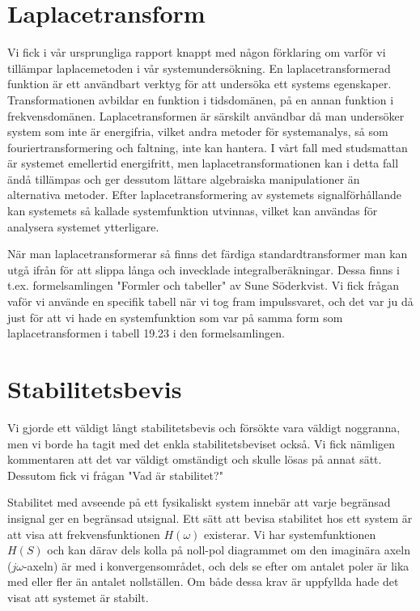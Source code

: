 \documentclass[10pt,a4paper]{article}
\begin{document}
\section{Laplacetransform}
Vi fick i vår ursprungliga rapport knappt med någon förklaring om varför vi tillämpar laplacemetoden i vår systemundersökning. En laplacetransformerad funktion är ett användbart verktyg för att undersöka ett systems egenskaper. Transformationen avbildar en funktion i tidsdomänen, på en annan funktion i frekvensdomänen. Laplacetransformen är särskilt användbar då man undersöker system som inte är energifria, vilket andra metoder för systemanalys, så som fouriertransformering och faltning, inte kan hantera. I vårt fall med studsmattan är systemet emellertid energifritt, men laplacetransformationen kan i detta fall ändå tillämpas och ger dessutom lättare algebraiska manipulationer än alternativa metoder.
Efter laplacetransformering av systemets signalförhållande kan systemets så kallade systemfunktion utvinnas, vilket kan användas för analysera systemet ytterligare.

När man laplacetransformerar så finns det färdiga standardtransformer man kan utgå ifrån för att slippa långa och invecklade integralberäkningar. Dessa finns i t.ex. formelsamlingen "Formler och tabeller" av Sune Söderkvist. Vi fick frågan vaför vi använde en specifik tabell när vi tog fram impulssvaret, och det var ju då just för att vi hade en systemfunktion som var på samma form som laplacetransformen i tabell 19.23 i den formelsamlingen.

\section{Stabilitetsbevis}

Vi gjorde ett väldigt långt stabilitetsbevis och försökte vara väldigt noggranna, men vi borde ha tagit med det enkla stabilitetsbeviset också. Vi fick nämligen kommentaren att det var väldigt omständigt och skulle lösas på annat sätt. Dessutom fick vi frågan "Vad är stabilitet?"

Stabilitet med avseende på ett fysikaliskt system innebär att varje begränsad insignal ger en begränsad utsignal. Ett sätt att bevisa stabilitet hos ett system är att visa att frekvensfunktionen $H(\omega)$ existerar. Vi har systemfunktionen $H(S)$ och kan därav dels kolla på noll-pol diagrammet om den imaginära axeln ($j\omega$-axeln) är med i konvergensområdet, och dels se efter om antalet poler är lika med eller fler än antalet nollställen. Om både dessa krav är uppfyllda hade det visat att systemet är stabilt. 
\end{document}
